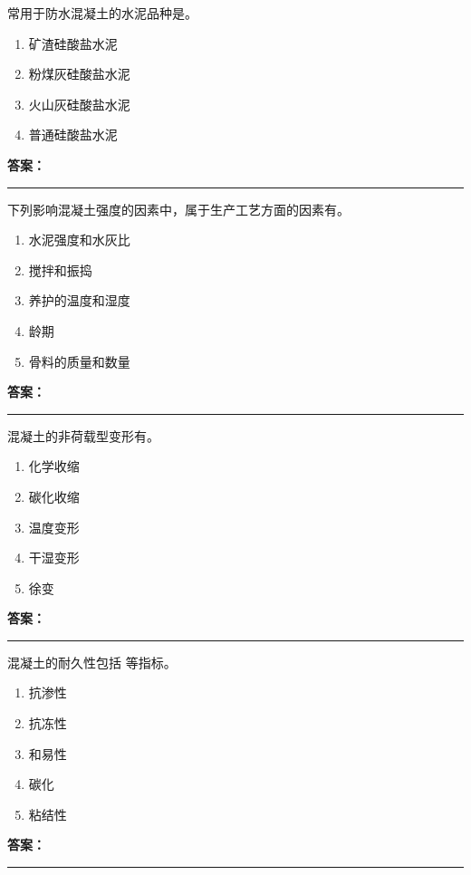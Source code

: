 \documentclass[UTF8,fontset=fandol,11pt]{ctexart}
\newcommand{\answerline}{\textcolor{answerred}{\rule{2.4cm}{0.7pt}}}
\begin{document}
\begin{quizbox}[title={第 61 题}]
常用于防水混凝土的水泥品种是。\\
\begin{enumerate}[label=\Alph*.]
\item 矿渣硅酸盐水泥
\item 粉煤灰硅酸盐水泥
\item 火山灰硅酸盐水泥
\item 普通硅酸盐水泥
\end{enumerate}
\textbf{\textcolor{answerred}{答案：}} \answerline
\end{quizbox}

\begin{quizbox}[title={第 62 题}]
下列影响混凝土强度的因素中，属于生产工艺方面的因素有。\\
\begin{enumerate}[label=\Alph*.]
\item 水泥强度和水灰比
\item 搅拌和振捣
\item 养护的温度和湿度
\item 龄期
\item 骨料的质量和数量
\end{enumerate}
\textbf{\textcolor{answerred}{答案：}} \answerline
\end{quizbox}

\begin{quizbox}[title={第 63 题}]
混凝土的非荷载型变形有。\\
\begin{enumerate}[label=\Alph*.]
\item 化学收缩
\item 碳化收缩
\item 温度变形
\item 干湿变形
\item 徐变
\end{enumerate}
\textbf{\textcolor{answerred}{答案：}} \answerline
\end{quizbox}

\begin{quizbox}[title={第 64 题}]
混凝土的耐久性包括 等指标。\\
\begin{enumerate}[label=\Alph*.]
\item 抗渗性
\item 抗冻性
\item 和易性
\item 碳化
\item 粘结性
\end{enumerate}
\textbf{\textcolor{answerred}{答案：}} \answerline
\end{quizbox}
\end{document}
